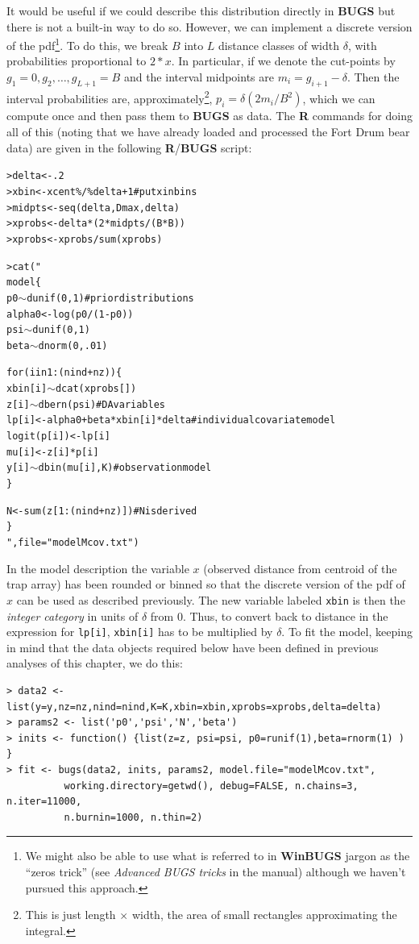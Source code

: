 It would be useful if we could describe this distribution directly in {\bf
  BUGS} but there is not a built-in way to do so. However, we can
implement a discrete version of the pdf\footnote{We might
also be able to use what is referred to in {\bf WinBUGS} jargon as the
``zeros trick'' (see {\it Advanced BUGS tricks} in the manual)
although we haven't pursued this approach.}. To do this,
we break $B$ into $L$
distance classes of width $\delta$, with probabilities proportional to
$2*x$. In particular, if we denote the cut-points by $g_{1}=0,g_{2},
\ldots, g_{L+1}=B$ and the interval midpoints are $m_{i} =
g_{i+1}-\delta$.
Then the interval probabilities are, approximately\footnote{This is
  just length $\times$ width, the area of small rectangles approximating the integral.}, $p_{i} =
\delta (2 m_{i} /B^{2})$, which we can compute once and then
pass them to {\bf BUGS} as data.
The {\bf R} commands for doing all of this (noting that we have
already loaded and processed the Fort Drum bear data) are given in the
following {\bf R}/{\bf BUGS} script:
{\small
\begin{alltt}
> delta <- .2
> xbin <- xcent\%/\%delta  + 1                # put x in bins
> midpts <- seq(delta,Dmax,delta)
> xprobs <- delta*(2*midpts/(B*B))
> xprobs <- xprobs/sum(xprobs)

> cat("
model\{
p0\( \sim \)dunif(0,1)                      # prior distributions
alpha0 <- log(p0/(1-p0))
psi\( \sim \)dunif(0,1)
beta\( \sim \)dnorm(0,.01)

for(i in 1:(nind+nz))\{
  xbin[i]\( \sim \)dcat(xprobs[])
  z[i]\( \sim \)dbern(psi)                  # DA variables
  lp[i] <- alpha0 + beta*xbin[i]*delta # individual covariate model
  logit(p[i]) <- lp[i]
  mu[i] <- z[i]*p[i]
  y[i]\( \sim \)dbin(mu[i],K)               #  observation model
 \}

N<-sum(z[1:(nind+nz)])                      # N is derived
\}
",file="modelMcov.txt")
\end{alltt}
}
In the model description the variable $x$ (observed distance
from centroid of the trap array) has been rounded or binned so that the discrete
version of the pdf of $x$ can be used as described previously. The new
variable labeled \mbox{\tt xbin} is then the {\it integer category}
in units of $\delta$ from 0. Thus, to convert back to distance in the
expression for \mbox{\tt lp[i]}, \mbox{\tt xbin[i]} has to be multiplied by
$\delta$.
To fit the model, keeping in mind that the data objects
required below have been defined in previous analyses of this chapter,
we do this:
{\small
\begin{verbatim}
> data2 <- list(y=y,nz=nz,nind=nind,K=K,xbin=xbin,xprobs=xprobs,delta=delta)
> params2 <- list('p0','psi','N','beta')
> inits <- function() {list(z=z, psi=psi, p0=runif(1),beta=rnorm(1) ) }
> fit <- bugs(data2, inits, params2, model.file="modelMcov.txt",
          working.directory=getwd(), debug=FALSE, n.chains=3, n.iter=11000,
          n.burnin=1000, n.thin=2)
\end{verbatim}
}

